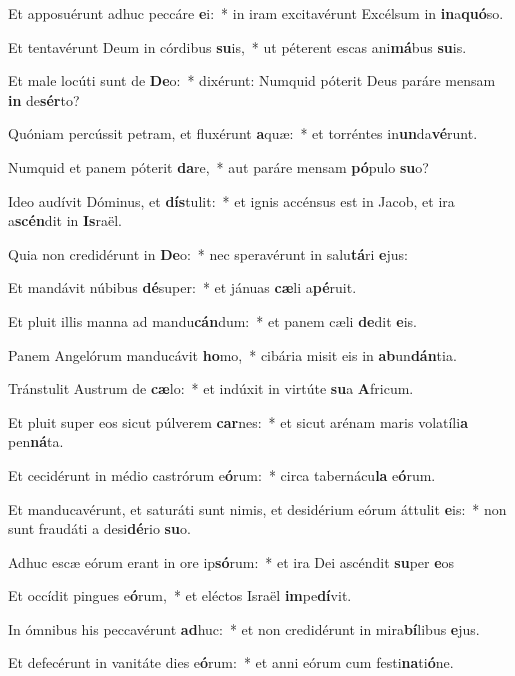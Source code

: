 \item Et apposuérunt adhuc peccáre \textbf{e}i:~* in iram excitavérunt Excélsum in \textbf{in}a\textbf{quó}so.
\item Et tentavérunt Deum in córdibus \textbf{su}is,~* ut péterent escas ani\textbf{má}bus \textbf{su}is.
\item Et male locúti sunt de \textbf{De}o:~* dixérunt: Numquid póterit Deus paráre mensam \textbf{in} de\textbf{sér}to?
\item Quóniam percússit petram, et fluxérunt \textbf{a}quæ:~* et torréntes in\textbf{un}da\textbf{vé}runt.
\item Numquid et panem póterit \textbf{da}re,~* aut paráre mensam \textbf{pó}pulo \textbf{su}o?
\item Ideo audívit Dóminus, et \textbf{dís}tulit:~* et ignis accénsus est in Jacob, et ira a\textbf{scén}dit in \textbf{Is}raël.
\item Quia non credidérunt in \textbf{De}o:~* nec speravérunt in salu\textbf{tá}ri \textbf{e}jus:
\item Et mandávit núbibus \textbf{dé}super:~* et jánuas \textbf{cæ}li a\textbf{pé}ruit.
\item Et pluit illis manna ad mandu\textbf{cán}dum:~* et panem cæli \textbf{de}dit \textbf{e}is.
\item Panem Angelórum manducávit \textbf{ho}mo,~* cibária misit eis in \textbf{ab}un\textbf{dán}tia.
\item Tránstulit Austrum de \textbf{cæ}lo:~* et indúxit in virtúte \textbf{su}a \textbf{A}fricum.
\item Et pluit super eos sicut púlverem \textbf{car}nes:~* et sicut arénam maris volatíli\textbf{a} pen\textbf{ná}ta.
\item Et cecidérunt in médio castrórum e\textbf{ó}rum:~* circa tabernácu\textbf{la} e\textbf{ó}rum.
\item Et manducavérunt, et saturáti sunt nimis, et desidérium eórum áttulit \textbf{e}is:~* non sunt fraudáti a desi\textbf{dé}rio \textbf{su}o.
\item Adhuc escæ eórum erant in ore ip\textbf{só}rum:~* et ira Dei ascéndit \textbf{su}per \textbf{e}os
\item Et occídit pingues e\textbf{ó}rum,~* et eléctos Israël \textbf{im}pe\textbf{dí}vit.
\item In ómnibus his peccavérunt \textbf{ad}huc:~* et non credidérunt in mira\textbf{bí}libus \textbf{e}jus.
\item Et defecérunt in vanitáte dies e\textbf{ó}rum:~* et anni eórum cum festi\textbf{na}ti\textbf{ó}ne.
